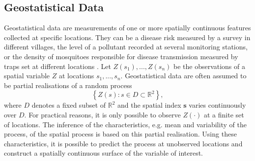 \subsection{Geostatistical Data}
Geostatistical data are measurements of one or more spatially continuous features collected at specific locations. They can be a disease risk measured by a survey in different villages, the level of a pollutant recorded at several monitoring stations, or the density of mosquitoes responsible for disease transmission measured by traps set at different locations \autocite[][]{waller2004applied}. Let $Z\left(s_1\right), ..., Z\left(s_n\right)$ be the observations of a spatial variable $Z$ at locations $s_1,...,s_n$. Geostatistical data are often assumed to be partial realisations of a random process
\begin{equation}
    \left\lbrace Z\left( s\right):s\in D\subset\mathbb{R}^2\right\rbrace,
\end{equation}
where $D$ denotes a fixed subset of $\mathbb{R}^2$ and the spatial index $\pmb{s}$ varies continuously over $D$. For practical reasons, it is only possible to observe $Z\left(\cdot\right)$ at a finite set of locations. The inference of the characteristics, e.g. mean and variability of the process, of the spatial process is based on this partial realisation. Using these characteristics, it is possible to predict the process at unobserved locations and construct a spatially continuous surface of the variable of interest.
